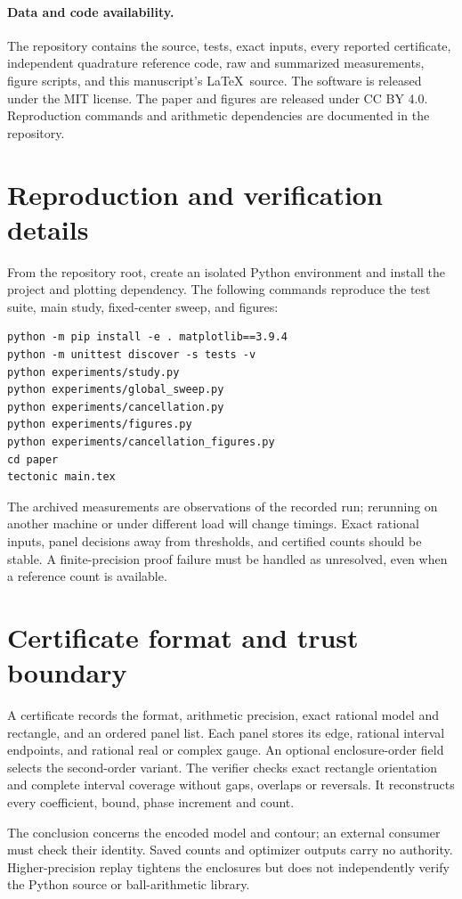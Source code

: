 \documentclass[11pt,a4paper]{article}
\begin{document}
\paragraph{Data and code availability.}
The repository contains the source, tests, exact inputs, every reported certificate, independent quadrature reference code, raw and summarized measurements, figure scripts, and this manuscript's \LaTeX\ source. The software is released under the MIT license. The paper and figures are released under CC BY 4.0. Reproduction commands and arithmetic dependencies are documented in the repository.




\appendix
\section{Reproduction and verification details}
From the repository root, create an isolated Python environment and install the project and plotting dependency. The following commands reproduce the test suite, main study, fixed-center sweep, and figures:
\begin{lstlisting}
python -m pip install -e . matplotlib==3.9.4
python -m unittest discover -s tests -v
python experiments/study.py
python experiments/global_sweep.py
python experiments/cancellation.py
python experiments/figures.py
python experiments/cancellation_figures.py
cd paper
tectonic main.tex
\end{lstlisting}
The archived measurements are observations of the recorded run; rerunning on another machine or under different load will change timings. Exact rational inputs, panel decisions away from thresholds, and certified counts should be stable. A finite-precision proof failure must be handled as unresolved, even when a reference count is available.

\section{Certificate format and trust boundary}
A certificate records the format, arithmetic precision, exact rational model and rectangle, and an ordered panel list. Each panel stores its edge, rational interval endpoints, and rational real or complex gauge. An optional enclosure-order field selects the second-order variant. The verifier checks exact rectangle orientation and complete interval coverage without gaps, overlaps or reversals. It reconstructs every coefficient, bound, phase increment and count.

The conclusion concerns the encoded model and contour; an external consumer must check their identity. Saved counts and optimizer outputs carry no authority. Higher-precision replay tightens the enclosures but does not independently verify the Python source or ball-arithmetic library.
\end{document}
